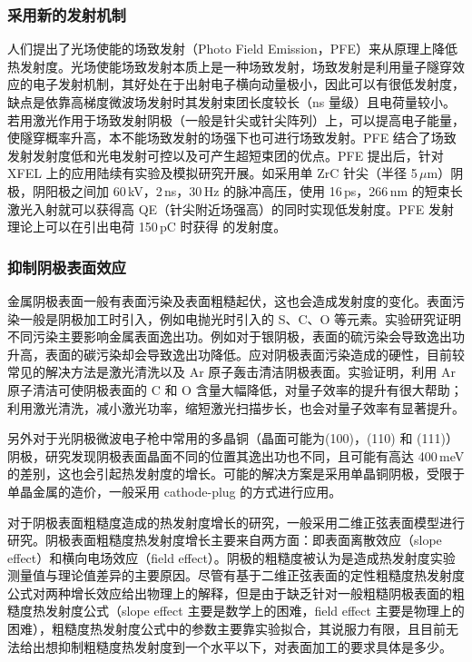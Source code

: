 \subsubsection{采用新的发射机制}
人们提出了光场使能的场致发射（Photo Field Emission，PFE）来从原理上降低热发射度\cite{Reifenberger:1979aa}。光场使能场致发射本质上是一种场致发射，场致发射是利用量子隧穿效应的电子发射机制，其好处在于出射电子横向动量极小，因此可以有很低发射度，缺点是依靠高梯度微波场发射时其发射束团长度较长（ns 量级）且电荷量较小。若用激光作用于场致发射阴极（一般是针尖或针尖阵列）上，可以提高电子能量，使隧穿概率升高，本不能场致发射的场强下也可进行场致发射。PFE 结合了场致发射发射度低和光电发射可控以及可产生超短束团的优点。PFE 提出后，针对 XFEL 上的应用陆续有实验\cite{Ganter:2008aa,Mingels:2012aa,Mingels:2013aa,Mingels:2014aa}及模拟研究\cite{Fallahi:2014aa}开展。如采用单 ZrC 针尖（半径 5\,$\mu$m）阴极，阴阳极之间加 60\,kV，2\,ns，30\,Hz 的脉冲高压，使用 16\,ps，266\,nm 的短束长激光入射就可以获得高 QE（针尖附近场强高）的同时实现低发射度。PFE 发射理论上可以在引出电荷 150\,pC 时获得  的发射度。

\subsubsection{抑制阴极表面效应}
金属阴极表面一般有表面污染及表面粗糙起伏，这也会造成发射度的变化。表面污染一般是阴极加工时引入，例如电抛光时引入的 S、C、O 等元素。实验研究证明不同污染主要影响金属表面逸出功\cite{Chelvayohan:1982aa,Opower:2006aa,Valizadeh:2013aa}。例如对于银阴极，表面的硫污染会导致逸出功升高，表面的碳污染却会导致逸出功降低\cite{Chelvayohan:1982aa}。应对阴极表面污染造成的硬性，目前较常见的解决方法是激光清洗\cite{Brachmann:2011aa}以及 Ar 原子轰击清洁阴极表面\cite{Chelvayohan:1982aa,Valizadeh:2013aa}。实验证明，利用 Ar 原子清洁可使阴极表面的 C 和 O 含量大幅降低，对量子效率的提升有很大帮助\cite{Valizadeh:2013aa}；利用激光清洗，减小激光功率，缩短激光扫描步长，也会对量子效率有显著提升\cite{Brachmann:2011aa}。

另外对于光阴极微波电子枪中常用的多晶铜（晶面可能为(100)，(110) 和 (111)）阴极，研究发现阴极表面晶面不同的位置其逸出功也不同，且可能有高达 400\,meV 的差别\cite{Renault:2006aa}，这也会引起热发射度的增长。可能的解决方案是采用单晶铜阴极，受限于单晶金属的造价，一般采用 cathode-plug 的方式进行应用\cite{Ganter:2013aa}。

对于阴极表面粗糙度造成的热发射度增长的研究，一般采用二维正弦表面模型进行研究\cite{He:2004aa,Krasilnikov:2006aa,Karkare:2011aa}。阴极表面粗糙度热发射度增长主要来自两方面：即表面离散效应（slope effect）和横向电场效应（field effect）\cite{Bradley:1977aa}。阴极的粗糙度被认为是造成热发射度实验测量值与理论值差异的主要原因\cite{qian2012experimental,Vecchione:2012aa,schubert2013bi}。尽管有基于二维正弦表面的定性粗糙度热发射度公式对两种增长效应给出物理上的解释，但是由于缺乏针对一般粗糙阴极表面的粗糙度热发射度公式（slope effect 主要是数学上的困难，field effect 主要是物理上的困难），粗糙度热发射度公式中的参数主要靠实验拟合，其说服力有限，且目前无法给出想抑制粗糙度热发射度到一个水平以下，对表面加工的要求具体是多少。

